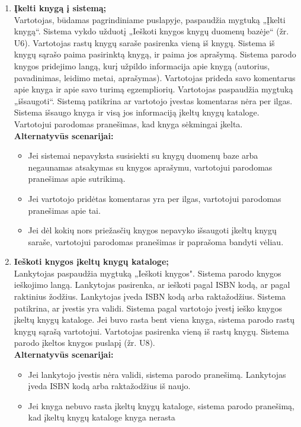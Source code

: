\documentclass{VUMIFPSkursinis}
\begin{document}
\begin{enumerate}[label=\textbf{U\arabic*.}]
			\item \textbf{Įkelti knygą į sistemą;}\\
				Vartotojas, būdamas pagrindiniame puslapyje, paspaudžia mygtuką „Įkelti knygą“. Sistema vykdo užduotį „Ieškoti knygos knygų duomenų bazėje“ (žr. U6).
				Vartotojas rastų knygų saraše pasirenka vieną iš knygų. Sistema iš knygų sąrašo paima pasirinktą knygą, ir paima jos aprašymą.
				Sistema parodo knygos pridejimo langą, kurį užpildo informacija apie knygą (autorius, pavadinimas, leidimo metai, aprašymas). Vartotojas prideda savo komentarus apie knyga ir apie
				savo turimą egzempliorių. Vartotojas paspaudžia mygtuką „išsaugoti“. Sistemą patikrina ar vartotojo įvestas komentaras nėra per ilgas.
				Sistema išsaugo knyga ir visą jos informaciją įkeltų knygų kataloge. Vartotojui parodomas pranešimas, kad knyga sėkmingai įkelta.\\
				\textbf{Alternatyvūs scenarijai:}
				\begin{itemize}
					\item Jei sistemai nepavyksta susisiekti su knygų duomenų baze arba negaunamas atsakymas su knygos aprašymu, vartotojui parodomas pranešimas apie sutrikimą.
					\item Jei vartotojo pridėtas komentaras yra per ilgas, vartotojui parodomas pranešimas apie tai.
					\item Jei dėl kokių nors priežasčių knygos nepavyko išsaugoti įkeltų knygų saraše, vartotojui parodomas pranešimas ir paprašoma bandyti vėliau.
				\end{itemize}
			\item \textbf{Ieškoti knygos įkeltų knygų kataloge;}\\
				Lankytojas paspaudžia mygtuką „Ieškoti knygos". Sistema parodo knygos ieškojimo langą.
				Lankytojas pasirenka, ar ieškoti pagal ISBN kodą, ar pagal raktinius žodžius. 
				Lankytojas įveda ISBN kodą arba raktažodžius. Sistema patikrina, ar įvestis yra validi.
				Sistema pagal vartotojo įvestį ieško knygos įkeltų knygų kataloge. 
				Jei buvo rasta bent viena knyga, sistema parodo rastų knygų sąrašą vartotojui. Vartotojas pasirenka vieną iš rastų knygų.
				Sistema parodo įkeltos knygos puslapį (žr. U8).\\
				\textbf{Alternatyvūs scenarijai:}
				\begin{itemize}
					\item Jei lankytojo įvestis nėra validi, sistema parodo pranešimą. Lankytojas įveda ISBN kodą arba raktažodžius iš naujo.
					\item Jei knyga nebuvo rasta įkeltų knygų kataloge, sistema parodo pranešimą, kad įkeltų knygų kataloge knyga nerasta 

\end{itemize}
\end{enumerate}
\end{document}
